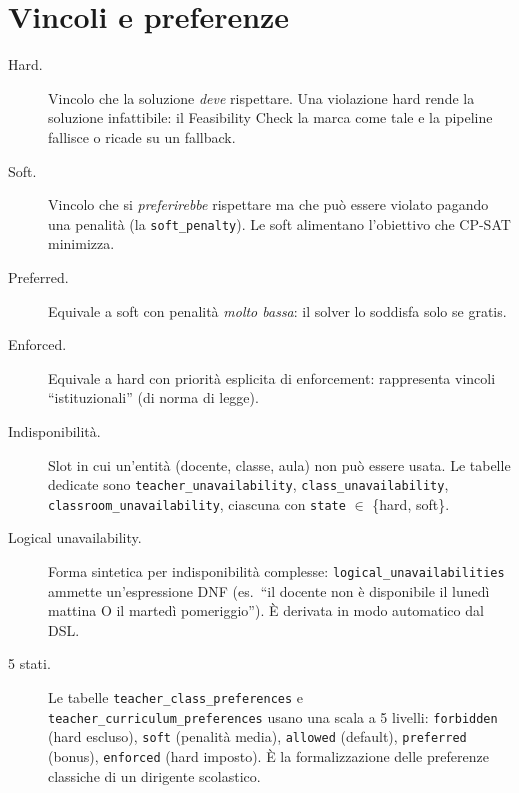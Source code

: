 \section{Vincoli e preferenze}

\begin{description}
\item[Hard.]
  Vincolo che la soluzione \emph{deve} rispettare. Una
  violazione hard rende la soluzione infattibile: il
  Feasibility Check la marca come tale e la pipeline
  fallisce o ricade su un fallback.

\item[Soft.]
  Vincolo che si \emph{preferirebbe} rispettare ma che
  pu\`o essere violato pagando una penalit\`a (la
  \texttt{soft\_penalty}). Le soft alimentano l'obiettivo
  che CP-SAT minimizza.

\item[Preferred.]
  Equivale a soft con penalit\`a \emph{molto bassa}: il
  solver lo soddisfa solo se gratis.

\item[Enforced.]
  Equivale a hard con priorit\`a esplicita di
  enforcement: rappresenta vincoli ``istituzionali''
  (di norma di legge).

\item[Indisponibilit\`a.]
  Slot in cui un'entit\`a (docente, classe, aula) non pu\`o
  essere usata. Le tabelle dedicate sono
  \texttt{teacher\_unavailability},
  \texttt{class\_unavailability},
  \texttt{classroom\_unavailability}, ciascuna con
  \texttt{state} $\in$ \{hard, soft\}.

\item[Logical unavailability.]
  Forma sintetica per indisponibilit\`a complesse:
  \texttt{logical\_unavailabilities} ammette
  un'espressione DNF (es.\ ``il docente non \`e disponibile
  il luned\`i mattina O il marted\`i pomeriggio''). \`E
  derivata in modo automatico dal DSL.

\item[5 stati.]
  Le tabelle \texttt{teacher\_class\_preferences} e
  \texttt{teacher\_curriculum\_preferences} usano una
  scala a 5 livelli: \texttt{forbidden} (hard escluso),
  \texttt{soft} (penalit\`a media), \texttt{allowed}
  (default), \texttt{preferred} (bonus), \texttt{enforced}
  (hard imposto). \`E la formalizzazione delle preferenze
  classiche di un dirigente scolastico.
\end{description}

